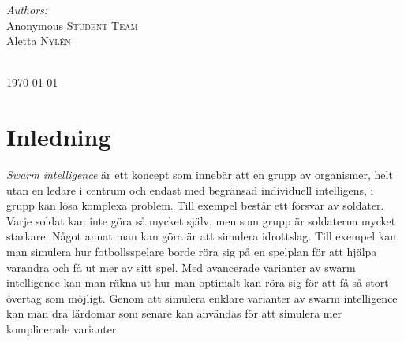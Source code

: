 \documentclass[12pt]{article}
\begin{document}
\begin{titlepage}

\begin{minipage}{0.6\textwidth}
\begin{flushleft} \large
\emph{Authors:}\\
Anonymous \textsc{Student Team}\\ %
Aletta \textsc{Nylén}\\ %
\end{flushleft}

\end{minipage}\\[2cm]



{\large \today}\\[2cm] %

\vfill %





\end{titlepage}
\section{Inledning}
\textit{Swarm intelligence} är ett koncept som innebär att en grupp av organismer,
helt utan en ledare i centrum och endast med begränsad individuell intelligens, 
i grupp kan lösa komplexa problem.
Till exempel består ett försvar av soldater.
Varje soldat kan inte göra så mycket själv, men som grupp är soldaterna mycket starkare.
Något annat man kan göra är att simulera idrottslag.
Till exempel kan man simulera hur fotbollsspelare borde röra sig på en spelplan för att hjälpa varandra och få ut mer av sitt spel.
Med avancerade varianter av swarm intelligence kan man räkna ut hur man optimalt kan röra sig för att få så stort övertag som möjligt.
Genom att simulera enklare varianter av swarm intelligence kan man dra lärdomar som senare kan användas för att simulera mer komplicerade varianter.
\end{document}
